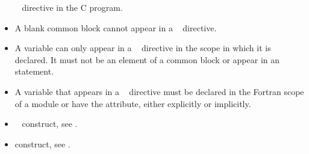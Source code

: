 \begin{fortranspecific}
\begin{itemize}
      ~ directive in the C program.
\item A blank common block cannot appear in a ~
      directive.
\item A variable can only appear in a ~ directive
      in the scope in which it is declared. It must not be an element of a
      common block or appear in an  statement.
\item A variable that appears in a ~ directive
      must be declared in the Fortran scope of a module or have the
       attribute, either explicitly or implicitly.
\end{itemize}
\end{fortranspecific}

\crossreferences
\begin{itemize}
\item {}~ construct, see
.

\item {} construct, see
.
\end{itemize}
